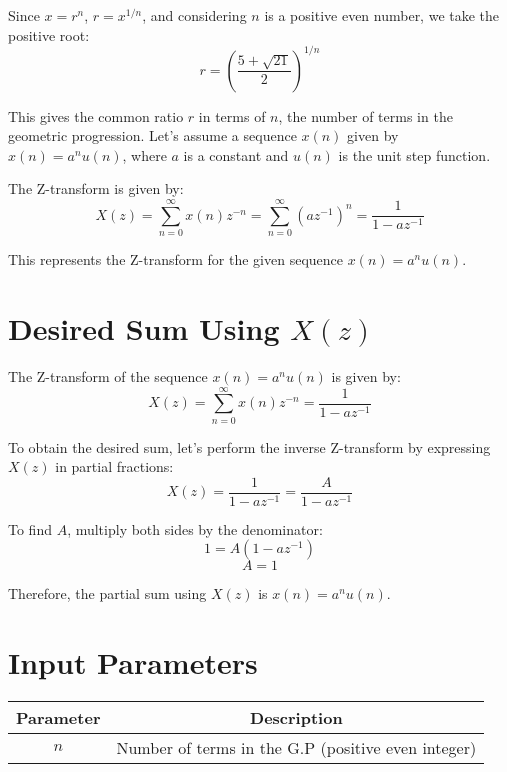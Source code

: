 \documentclass{article}
\begin{document}
Since \( x = r^n \), \( r = x^{1/n} \), and considering \( n \) is a positive even number, we take the positive root:
\[ r = \left(\frac{{5 + \sqrt{21}}}{2}\right)^{1/n} \]

This gives the common ratio \( r \) in terms of \( n \), the number of terms in the geometric progression.
Let's assume a sequence \( x(n) \) given by \( x(n) = a^n u(n) \), where \( a \) is a constant and \( u(n) \) is the unit step function.

The Z-transform is given by:
\[ X(z) = \sum_{n=0}^{\infty} x(n)z^{-n} = \sum_{n=0}^{\infty} (az^{-1})^n = \frac{1}{1 - az^{-1}} \]

This represents the Z-transform for the given sequence \( x(n) = a^n u(n) \).
\section*{Desired Sum Using $X(z)$}
The Z-transform of the sequence \( x(n) = a^n u(n) \) is given by:
\[ X(z) = \sum_{n=0}^{\infty} x(n)z^{-n} = \frac{1}{1 - az^{-1}} \]

To obtain the desired sum, let's perform the inverse Z-transform by expressing \( X(z) \) in partial fractions:
\[ X(z) = \frac{1}{1 - az^{-1}} = \frac{A}{1 - az^{-1}} \]

To find \(A\), multiply both sides by the denominator:
\[ 1 = A(1 - az^{-1}) \]
\[ A = 1 \]

Therefore, the partial sum using \(X(z)\) is \(x(n) = a^n u(n)\).


\section*{Input Parameters}
\begin{center}
\begin{tabular}{|c|c|}
\hline
Parameter & Description \\
\hline
\( n \) & Number of terms in the G.P (positive even integer) \\
\hline
\end{tabular}
\end{center}
\end{document}
